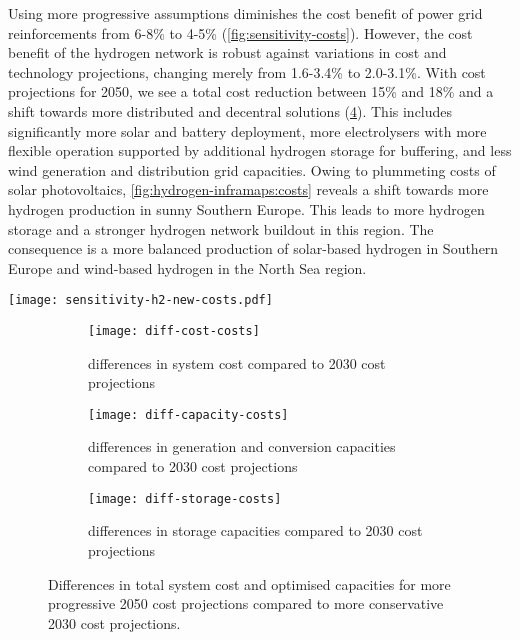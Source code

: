 Using more progressive assumptions diminishes the cost benefit of power grid
reinforcements from 6-8\% to 4-5\% (\cref{fig:sensitivity-costs}). However, the
cost benefit of the hydrogen network is robust against variations in cost and
technology projections, changing merely from 1.6-3.4\% to 2.0-3.1\%. With cost
projections for 2050, we see a total cost reduction between 15\% and 18\% and a
shift towards more distributed and decentral solutions
(\cref{fig:sensitivity-costs-diff}). This includes significantly more solar and
battery deployment, more electrolysers with more flexible operation supported by
additional hydrogen storage for buffering, and less wind generation and
distribution grid capacities. Owing to plummeting costs of solar photovoltaics,
\cref{fig:hydrogen-inframaps:costs} reveals a shift towards more hydrogen
production in sunny Southern Europe. This leads to more hydrogen storage and a
stronger hydrogen network buildout in this region. The consequence is a more
balanced production of solar-based hydrogen in Southern Europe and wind-based
hydrogen in the North Sea region.

\begin{SCfigure}
    \centering
    \texttt{[image: sensitivity-h2-new-costs.pdf]}
    \caption{Cost benefits of electricity and hydrogen network infrastructure with cost projections for 2050.}
    \label{fig:sensitivity-costs}
\end{SCfigure}

\begin{figure}
    \centering
    \begin{subfigure}[t]{\textwidth}
        \centering
        \caption{differences in system cost compared to 2030 cost projections}
        \texttt{[image: diff-cost-costs]}
        \label{fig:sensitivity-costs-cost}
    \end{subfigure}
    \begin{subfigure}[t]{\textwidth}
        \centering
        \caption{differences in generation and conversion capacities compared to 2030 cost projections}
        \texttt{[image: diff-capacity-costs]}
        \label{fig:sensitivity-costs-cap}
    \end{subfigure}
    \begin{subfigure}[t]{\textwidth}
        \centering
        \caption{differences in storage capacities compared to 2030 cost projections}
        \texttt{[image: diff-storage-costs]}
        \label{fig:sensitivity-costs-sto}
    \end{subfigure}
    \caption{Differences in total system cost and optimised capacities for more progressive 2050 cost projections compared to more conservative 2030 cost projections.}
    \label{fig:sensitivity-costs-diff}
\end{figure}


